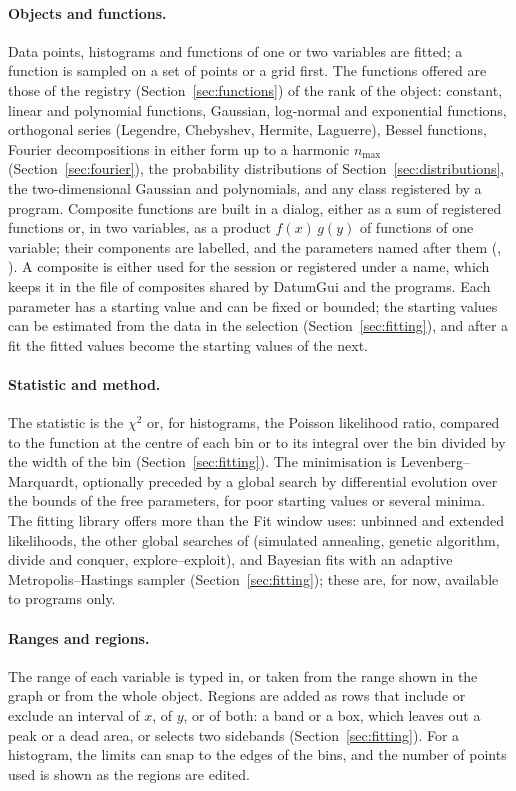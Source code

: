 \paragraph{Objects and functions.}
Data points, histograms and functions of one or two variables are fitted; a function is sampled on a set of points
or a grid first. The functions offered are those of the registry (Section~\ref{sec:functions}) of the rank of the
object: constant, linear and polynomial functions, Gaussian, log-normal and exponential functions, orthogonal series
(Legendre, Chebyshev, Hermite, Laguerre), Bessel functions, Fourier decompositions in either form up to a harmonic
$n_{\max}$ (Section~\ref{sec:fourier}), the probability distributions of Section~\ref{sec:distributions}, the
two-dimensional Gaussian and polynomials, and any class registered by a program. Composite functions are built in a dialog, either as a sum of registered functions or,
in two variables, as a product $f(x)\,g(y)$ of functions of one variable; their components are labelled, and the
parameters named after them (, ). A composite is either used for the session or
registered under a name, which keeps it in the file of composites shared by DatumGui and the programs. Each parameter
has a starting value and can be fixed or bounded; the starting values can be estimated from the data in the
selection (Section~\ref{sec:fitting}), and after a fit the fitted values become the starting values of the next.

\paragraph{Statistic and method.}
The statistic is the $\chi^2$ or, for histograms, the Poisson likelihood ratio, compared to the function at the centre
of each bin or to its integral over the bin divided by the width of the bin (Section~\ref{sec:fitting}). The minimisation is Levenberg--Marquardt, optionally preceded by a global
search by differential evolution over the bounds of the free parameters, for poor starting values or several minima.
The fitting library offers more than the Fit window uses: unbinned and extended likelihoods, the other global
searches of  (simulated annealing, genetic algorithm, divide and conquer, explore--exploit), and
Bayesian fits with an adaptive Metropolis--Hastings sampler (Section~\ref{sec:fitting}); these are, for now,
available to programs only.

\paragraph{Ranges and regions.}
The range of each variable is typed in, or taken from the range shown in the graph or from the whole object. Regions
are added as rows that include or exclude an interval of $x$, of $y$, or of both: a band or a box, which leaves out a
peak or a dead area, or selects two sidebands (Section~\ref{sec:fitting}). For a histogram, the limits can snap to
the edges of the bins, and the number of points used is shown as the regions are edited.


